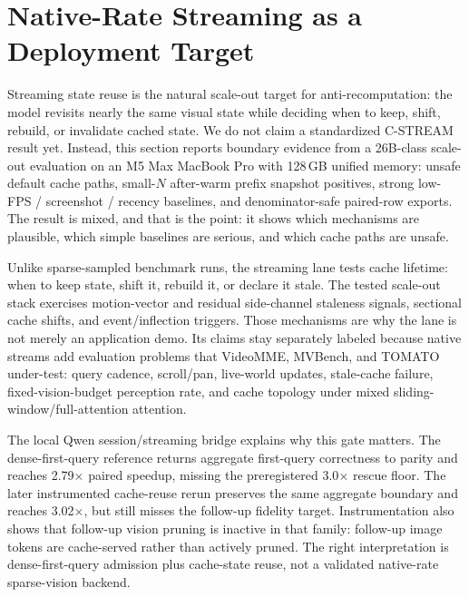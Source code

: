 \section{Native-Rate Streaming as a Deployment Target}

Streaming state reuse is the natural scale-out target for anti-recomputation:
the model revisits nearly the same visual state while deciding when to keep,
shift, rebuild, or invalidate cached state. We do not claim a standardized
C-STREAM result yet. Instead, this section reports boundary evidence from a
26B-class scale-out evaluation on an M5 Max MacBook Pro with 128\,GB unified
memory: unsafe default cache paths, small-\(N\) after-warm prefix snapshot
positives, strong
low-FPS / screenshot / recency baselines, and denominator-safe paired-row
exports. The result is mixed, and that is the point: it shows which mechanisms
are plausible, which simple baselines are serious, and which cache paths are
unsafe.

Unlike sparse-sampled benchmark runs, the streaming lane tests cache lifetime:
when to keep state, shift it, rebuild it, or declare it stale. The tested
scale-out stack exercises motion-vector and residual side-channel staleness
signals, sectional cache shifts, and event/inflection triggers. Those
mechanisms are why the lane is not merely an application demo. Its claims stay
separately labeled because native streams add evaluation problems that
VideoMME, MVBench, and TOMATO under-test: query cadence, scroll/pan, live-world
updates, stale-cache failure, fixed-vision-budget perception rate, and cache
topology under mixed sliding-window/full-attention attention.

The local Qwen session/streaming bridge explains why this gate matters. The
dense-first-query reference returns aggregate first-query correctness to parity
and reaches 2.79$\times$ paired speedup, missing the preregistered 3.0$\times$
rescue floor. The later instrumented cache-reuse rerun preserves the same
aggregate boundary and reaches 3.02$\times$, but still misses the follow-up
fidelity target. Instrumentation also shows that follow-up vision pruning is
inactive in that family: follow-up image tokens are cache-served rather than
actively pruned. The right interpretation is dense-first-query admission plus
cache-state reuse, not a validated native-rate sparse-vision backend.

